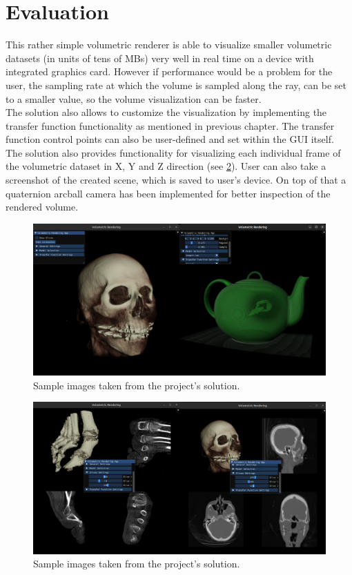 \documentclass[a4paper, 12pt]{article}
\begin{document}
\section{Evaluation}
This rather simple volumetric renderer is able to visualize smaller volumetric datasets (in units of tens of MBs) very well in real time on a device with integrated graphics card. 
However if performance would be a problem for the user, the sampling rate at which the volume is sampled along the ray, can be set to a smaller value, so the volume visualization can be faster.\\
The solution also allows to customize the visualization by implementing the transfer function functionality as mentioned in previous chapter. The transfer function control points can also be 
user-defined and set within the GUI itself. The solution also provides functionality for visualizing each individual frame of the volumetric dataset in X, Y and Z direction (see \ref{fig:surfaceplanes}). User can also 
take a screenshot of the created scene, which is saved to user's device. On top of that a quaternion arcball camera has been implemented for better inspection of the rendered volume. \\

\begin{figure}[htb]
  \centering
  \includegraphics[width=14cm,keepaspectratio]{merged_sample1.png}
  \caption{Sample images taken from the project's solution.}
  \label{fig:textures}
\end{figure}

\begin{figure}[htb]
  \centering
  \includegraphics[width=14cm,keepaspectratio]{foot.png}
  \caption{Sample images taken from the project's solution.}
  \label{fig:surfaceplanes}
\end{figure}
\end{document}
